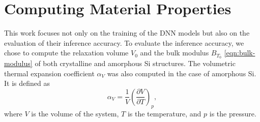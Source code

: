 \section{Computing Material Properties}

This work focuses not only on the training of the DNN models but also on
the evaluation of their inference accuracy. To evaluate the inference
accuracy, we chose to compute the relaxation volume $V_0$ and the bulk
modulus $B_{T_0}$ \eqref{eqn:bulk-modulus} of both crystalline and amorphous
Si structures. The volumetric thermal expansion coefficient $\alpha_V$ was
also computed in the case of amorphous Si. It is defined as
\begin{equation}
  \alpha_V = \frac{1}{V} \left( \frac{\partial V}{\partial T} \right)_p,
\end{equation}
where $V$ is the volume of the system, $T$ is the temperature, and $p$ is the
pressure.

